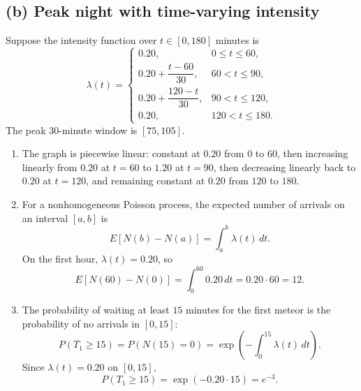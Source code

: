 \documentclass[11pt]{article}
\begin{document}
\subsection*{(b) Peak night with time-varying intensity}
Suppose the intensity function over $t\in[0,180]$ minutes is
\[
\lambda(t)=
\begin{cases}
0.20, & 0\le t\le 60,\\[0.5ex]
0.20+\dfrac{t-60}{30}, & 60<t\le 90,\\[1.2ex]
0.20+\dfrac{120-t}{30}, & 90<t\le 120,\\[1.2ex]
0.20, & 120<t\le 180.
\end{cases}
\]
The peak 30-minute window is $[75,105]$.

\begin{enumerate}[label=\textit{\roman*.}]
\item The graph is piecewise linear: constant at $0.20$ from $0$ to $60$, then increasing linearly from $0.20$ at $t=60$ to $1.20$ at $t=90$, then decreasing linearly back to $0.20$ at $t=120$, and remaining constant at $0.20$ from $120$ to $180$.

\item For a nonhomogeneous Poisson process, the expected number of arrivals on an interval $[a,b]$ is
\[
E[N(b)-N(a)]=\int_a^b \lambda(t)\,dt.
\]
On the first hour, $\lambda(t)=0.20$, so
\[
E[N(60)-N(0)]=\int_0^{60}0.20\,dt=0.20\cdot60=12.
\]

\item The probability of waiting at least $15$ minutes for the first meteor is the probability of no arrivals in $[0,15]$:
\[
P(T_1\ge15)=P(N(15)=0)=\exp\left(-\int_0^{15}\lambda(t)\,dt\right).
\]
Since $\lambda(t)=0.20$ on $[0,15]$,
\[
P(T_1\ge15)=\exp(-0.20\cdot15)=e^{-3}.
\]


\end{enumerate}
\end{document}
